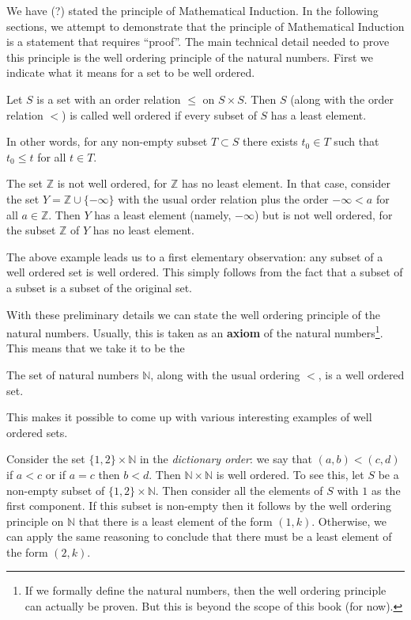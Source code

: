 We have (?) stated the principle of Mathematical Induction. In the following sections, we attempt to demonstrate that the principle of Mathematical Induction is a statement that requires ``proof''. The main technical detail needed to prove this principle is the well ordering principle of the natural numbers. First we indicate what it means for a set to be well ordered.

\begin{definition}
Let $S$ is a set with an order relation $\leq$ on $S \times S$. Then $S$ (along with the order relation $<$) is called well ordered if every subset of $S$ has a least element.
\end{definition}

In other words, for any non-empty subset $T \subset S$ there exists $t_0 \in T$ such that $t_0 \leq t$ for all $t \in T$.

\begin{example}
The set $\mathbb{Z}$ is not well ordered, for $\mathbb{Z}$ has no least element. In that case, consider the set $Y = \mathbb{Z} \cup \{-\infty\}$ with the usual order relation plus the order $-\infty < a$ for all $a \in \mathbb{Z}$. Then $Y$ has a least element (namely, $-\infty$) but is not well ordered, for the subset $\mathbb{Z}$ of $Y$ has no least element.
\end{example}

The above example leads us to a first elementary observation: any subset of a well ordered set is well ordered. This simply follows from the fact that a subset of a subset is a subset of the original set.

With these preliminary details we can state the well ordering principle of the natural numbers. Usually, this is taken as an \textbf{axiom} of the natural numbers\footnote{If we formally define the natural numbers, then the well ordering principle can actually be proven. But this is beyond the scope of this book (for now).}. This means that we take it to be the 
\begin{tcolorbox}
The set of natural numbers $\mathbb{N}$, along with the usual ordering $<$, is a well ordered set.
\end{tcolorbox}

This makes it possible to come up with various interesting examples of well ordered sets.

\begin{example} \label{dict_order}
Consider the set $\{1, 2\} \times \mathbb{N}$ in the \textit{dictionary order}: we say that $(a, b) < (c, d)$ if $a < c$ or if $a = c$ then $b < d$. Then $\mathbb{N} \times \mathbb{N}$ is well ordered. To see this, let $S$ be a non-empty subset of $\{1,2\} \times \mathbb{N}$. Then consider all the elements of $S$ with $1$ as the first component. If this subset is non-empty then it follows by the well ordering principle on $\mathbb{N}$ that there is a least element of the form $(1, k)$. Otherwise, we can apply the same reasoning to conclude that there must be a least element of the form $(2, k)$.
\end{example}


